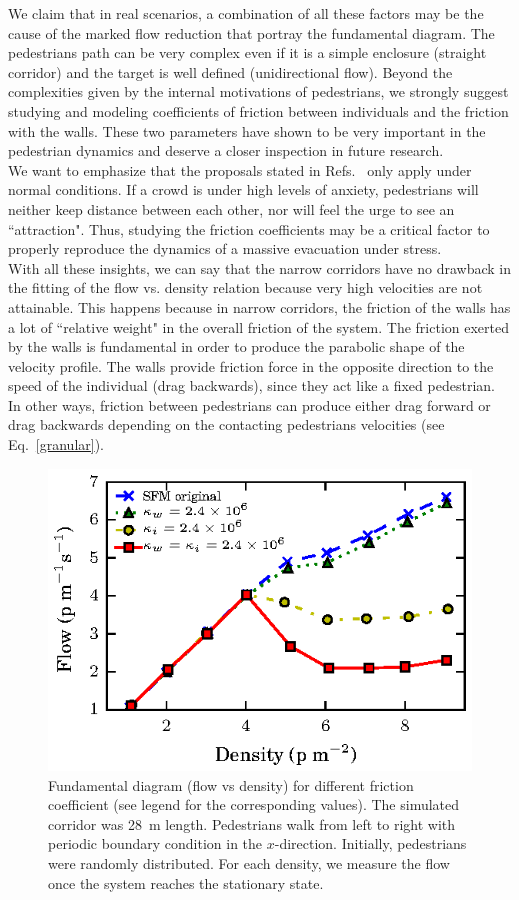 \documentclass[preprint,12pt]{elsarticle}
\begin{document}
We claim that in real scenarios, a combination of all these factors may be the cause of the marked flow reduction that portray the fundamental diagram. The pedestrians path can be very complex even if it is a simple enclosure (straight corridor) and the target is well defined (unidirectional flow). Beyond the complexities given by the internal motivations of pedestrians, we strongly suggest studying and modeling coefficients of friction between individuals and the friction with the walls. These two parameters have shown to be very important in the pedestrian dynamics and deserve a closer inspection in future research.\\

We want to emphasize that the proposals stated in 
Refs.~\cite{kwak,parisi2,johansson}  only apply under normal conditions. 
If a crowd is under high levels of anxiety, pedestrians will neither keep 
distance between each other, nor will feel the urge to see an ``attraction". 
Thus, studying the friction coefficients may be a critical factor to properly 
reproduce the dynamics of a massive evacuation under stress.\\

With all these insights, we can say that the narrow corridors have no drawback in the fitting of the flow vs. density relation because very high velocities are not attainable. This happens because in narrow corridors, the friction of the walls has a lot of ``relative weight" in the overall friction of the system. 
The friction exerted by the walls is fundamental in order to produce the parabolic shape of the velocity profile. The walls provide friction force in the opposite direction to the speed of the individual (drag backwards), since they act like a fixed pedestrian. In other ways, friction between pedestrians can produce either drag forward or drag backwards depending on the contacting pedestrians velocities (see Eq.~\ref{granular}).\\


\begin{figure}[htbp!]
\centering
\includegraphics[width=0.7\columnwidth]
{./flow-density_pasillo22m_fgmodified_multi.eps}
\caption{\label{fgmodified-w22} Fundamental diagram (flow vs density) for different friction coefficient (see legend for the corresponding values). The simulated corridor was 28~m length. Pedestrians walk from left to right with periodic boundary condition in the $x$-direction. Initially, pedestrians were randomly distributed. For each density, we measure the flow once the system reaches the stationary state.}
\end{figure}
\end{document}

